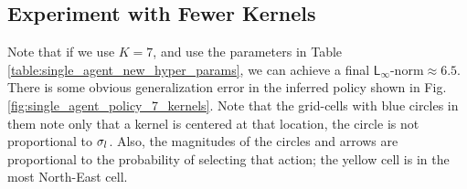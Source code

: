         \begin{figure}[H]
        \begin{center}
        \end{center}
        \end{figure}

    \subsection{Experiment with Fewer Kernels}

        Note that if we use $K=7$, and use the parameters in Table \ref{table:single_agent_new_hyper_params}, we can
        achieve a final $\mathsf{L}_{\infty}\text{-norm} \approx 6.5$. There is some obvious generalization error in the
        inferred policy shown in Fig. \ref{fig:single_agent_policy_7_kernels}. Note that the grid-cells with blue
        circles in them note only that a kernel is centered at that location, the circle is not proportional to
        $\sigma_{l}$. Also, the magnitudes of the circles and arrows are proportional to the probability of
        selecting that action; the yellow cell is in the most North-East cell.

